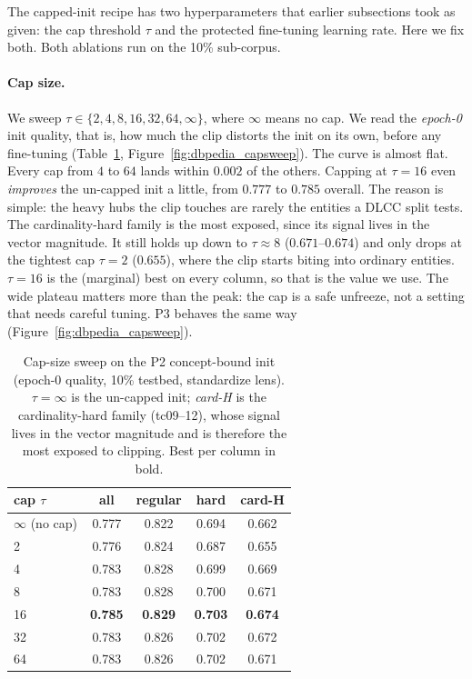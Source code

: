 \documentclass[a4paper,oneside,bibliography=totoc]{scrbook}
\begin{document}
The capped-init recipe has two hyperparameters that earlier subsections took as
given: the cap threshold $\tau$ and the protected fine-tuning learning rate. Here
we fix both. Both ablations run on the 10\% sub-corpus.

\paragraph{Cap size.} We sweep $\tau \in \{2,4,8,16,32,64,\infty\}$, where
$\infty$ means no cap. We read the \emph{epoch-0} init quality, that is, how much
the clip distorts the init on its own, before any fine-tuning
(Table~\ref{tab:dbpedia_capsize}, Figure~\ref{fig:dbpedia_capsweep}). The curve is
almost flat. Every cap from $4$ to $64$ lands within $0.002$ of the others.
Capping at $\tau=16$ even \emph{improves} the un-capped init a little, from
$0.777$ to $0.785$ overall. The reason is simple: the heavy hubs the clip touches
are rarely the entities a DLCC split tests. The cardinality-hard family is the
most exposed, since its signal lives in the vector magnitude. It still holds up
down to $\tau\approx 8$ ($0.671$--$0.674$) and only drops at the tightest cap
$\tau=2$ ($0.655$), where the clip starts biting into ordinary entities. $\tau=16$
is the (marginal) best on every column, so that is the value we use. The wide
plateau matters more than the peak: the cap is a safe unfreeze, not a setting that
needs careful tuning. P3 behaves the same way (Figure~\ref{fig:dbpedia_capsweep}).

\begin{table}[t]
\centering
\small
\caption{Cap-size sweep on the P2 concept-bound init (epoch-0 quality, 10\%
testbed, standardize lens). $\tau=\infty$ is the un-capped init; \emph{card-H} is
the cardinality-hard family (tc09--12), whose signal lives in the vector
magnitude and is therefore the most exposed to clipping. Best per column in bold.}
\label{tab:dbpedia_capsize}
\setlength{\tabcolsep}{6pt}
\begin{tabular}{lcccc}
\toprule
\textbf{cap $\tau$} & \textbf{all} & \textbf{regular} & \textbf{hard} & \textbf{card-H} \\
\midrule
$\infty$ (no cap) & 0.777 & 0.822 & 0.694 & 0.662 \\
2  & 0.776 & 0.824 & 0.687 & 0.655 \\
4  & 0.783 & 0.828 & 0.699 & 0.669 \\
8  & 0.783 & 0.828 & 0.700 & 0.671 \\
16 & \textbf{0.785} & \textbf{0.829} & \textbf{0.703} & \textbf{0.674} \\
32 & 0.783 & 0.826 & 0.702 & 0.672 \\
64 & 0.783 & 0.826 & 0.702 & 0.671 \\
\bottomrule
\end{tabular}
\end{table}
\end{document}
